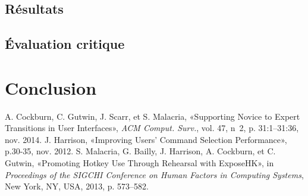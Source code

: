 \documentclass[12pt,a4paper]{article}
\begin{document}
\subsection{Résultats}
\subsection{Évaluation critique}
\section{Conclusion}
\newpage
\begin{thebibliography}{10}
	 A. Cockburn, C. Gutwin, J. Scarr, et S. Malacria, «Supporting Novice to Expert
	Transitions in User Interfaces», \textit{ACM Comput. Surv.}, vol. 47, n\textdegree\ 2, p. 31:1–31:36, nov. 2014.
	 J. Harrison, «Improving Users' Command Selection Performance», p.30-35, nov. 2012.
	 S. Malacria, G. Bailly, J. Harrison, A. Cockburn, et C. Gutwin, «Promoting Hotkey Use
	Through Rehearsal with ExposeHK», in \textit{Proceedings of the SIGCHI Conference on Human Factors in Computing Systems}, New York, NY, USA, 2013, p. 573–582.
\end{thebibliography}
\end{document}
